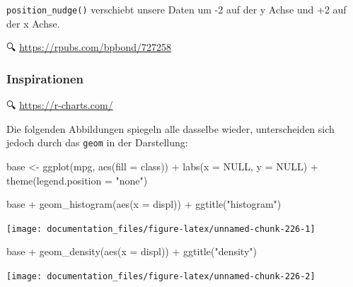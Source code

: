 \documentclass[
]{article}
\newenvironment{Shaded}{\begin{snugshade}}{\end{snugshade}}
\newcommand{\AttributeTok}[1]{\textcolor[rgb]{0.77,0.63,0.00}{#1}}
\newcommand{\ConstantTok}[1]{\textcolor[rgb]{0.00,0.00,0.00}{#1}}
\newcommand{\FunctionTok}[1]{\textcolor[rgb]{0.00,0.00,0.00}{#1}}
\newcommand{\NormalTok}[1]{#1}
\newcommand{\OtherTok}[1]{\textcolor[rgb]{0.56,0.35,0.01}{#1}}
\newcommand{\SpecialCharTok}[1]{\textcolor[rgb]{0.00,0.00,0.00}{#1}}
\newcommand{\StringTok}[1]{\textcolor[rgb]{0.31,0.60,0.02}{#1}}
\begin{document}
\texttt{position\_nudge()} verschiebt unsere Daten um -2 auf der y Achse und +2 auf der x Achse.

🔍 \url{https://rpubs.com/bpbond/727258}

\hypertarget{inspirationen}{%
\subsubsection{Inspirationen}\label{inspirationen}}

🔍 \url{https://r-charts.com/}

Die folgenden Abbildungen spiegeln alle dasselbe wieder, unterscheiden sich jedoch durch das \texttt{geom} in der Darstellung:

\begin{Shaded}
\begin{Highlighting}[]
\NormalTok{base }\OtherTok{\textless{}{-}} \FunctionTok{ggplot}\NormalTok{(mpg, }\FunctionTok{aes}\NormalTok{(}\AttributeTok{fill =}\NormalTok{ class)) }\SpecialCharTok{+}
  \FunctionTok{labs}\NormalTok{(}\AttributeTok{x =} \ConstantTok{NULL}\NormalTok{, }\AttributeTok{y =} \ConstantTok{NULL}\NormalTok{) }\SpecialCharTok{+}
  \FunctionTok{theme}\NormalTok{(}\AttributeTok{legend.position =} \StringTok{"none"}\NormalTok{)}

\NormalTok{base }\SpecialCharTok{+} \FunctionTok{geom\_histogram}\NormalTok{(}\FunctionTok{aes}\NormalTok{(}\AttributeTok{x =}\NormalTok{ displ)) }\SpecialCharTok{+} \FunctionTok{ggtitle}\NormalTok{(}\StringTok{"histogram"}\NormalTok{)}
\end{Highlighting}
\end{Shaded}

\begin{center}\texttt{[image: documentation\_files/figure-latex/unnamed-chunk-226-1]} \end{center}

\begin{Shaded}
\begin{Highlighting}[]
\NormalTok{base }\SpecialCharTok{+} \FunctionTok{geom\_density}\NormalTok{(}\FunctionTok{aes}\NormalTok{(}\AttributeTok{x =}\NormalTok{ displ)) }\SpecialCharTok{+} \FunctionTok{ggtitle}\NormalTok{(}\StringTok{"density"}\NormalTok{)}
\end{Highlighting}
\end{Shaded}

\begin{center}\texttt{[image: documentation\_files/figure-latex/unnamed-chunk-226-2]} \end{center}
\end{document}
